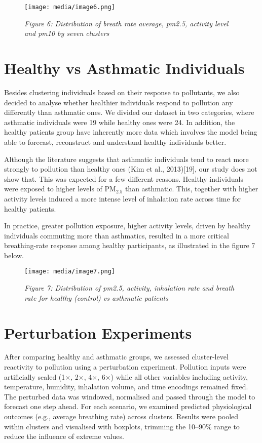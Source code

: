 \documentclass[12pt,a4paper]{report}
\begin{document}
\begin{figure}[h!]
    \centering
    \texttt{[image: media/image6.png]}
    \caption*{\emph{Figure 6: Distribution of breath rate average, pm2.5, activity
level and pm10 by seven clusters}}
\end{figure}


\section{Healthy vs Asthmatic Individuals}
Besides clustering individuals based on their response to pollutants, we
also decided to analyse whether healthier individuals respond to
pollution any differently than asthmatic ones. We divided our dataset in
two categories, where asthmatic individuals were 19 while healthy ones
were 24. In addition, the healthy patients group have inherently more
data which involves the model being able to forecast, reconstruct and
understand healthy individuals better.

Although the literature suggests that asthmatic individuals tend to
react more strongly to pollution than healthy ones (Kim et al.,
2013){[}19{]}, our study does not show that. This was expected for a few
different reasons. Healthy individuals were exposed to higher levels of
$\mathrm{PM}_{2.5}$ than asthmatic. This, together with higher activity levels induced
a more intense level of inhalation rate across time for healthy
patients.

In practice, greater pollution exposure, higher activity levels, driven
by healthy individuals commuting more than asthmatics, resulted in a
more critical breathing-rate response among healthy participants, as
illustrated in the figure 7 below.

\begin{figure}[h!]
    \centering
    \texttt{[image: media/image7.png]}
    \caption*{\emph{Figure 7: Distribution of pm2.5, activity, inhalation rate and
breath rate for healthy (control) vs asthmatic patients}}
\end{figure}


\section{Perturbation Experiments}
After comparing healthy and asthmatic groups, we assessed cluster-level
reactivity to pollution using a perturbation experiment. Pollution
inputs were artificially scaled (1×, 2×, 4×, 6×) while all other
variables including activity, temperature, humidity, inhalation volume, and time
encodings remained fixed. The perturbed data was windowed, normalised and passed through the model to forecast one
step ahead. For each scenario, we examined predicted physiological
outcomes (e.g., average breathing rate) across clusters. Results were
pooled within clusters and visualised with boxplots, trimming the
10--90\% range to reduce the influence of extreme values.
\end{document}
